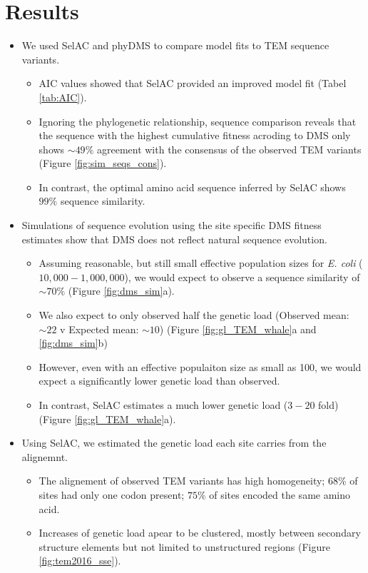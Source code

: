 \documentclass[12pt]{article}
\begin{document}
\section*{Results}
\begin{itemize}
	\item We used SelAC and phyDMS to compare model fits to TEM sequence variants.
	\begin{itemize}
		\item AIC values showed that SelAC provided an improved model fit (Tabel \ref{tab:AIC}).
		\item Ignoring the phylogenetic relationship, sequence comparison reveals that the sequence with the highest cumulative fitness acroding to DMS only shows $\sim49 \%$ agreement with the consensus of the observed TEM variants (Figure \ref{fig:sim_seqs_cons}).
		\item In contrast, the optimal amino acid sequence inferred by SelAC shows $99\%$ sequence similarity.
	\end{itemize}
	\item Simulations of sequence evolution using the site specific DMS fitness estimates show that DMS does not reflect natural sequence evolution.
	\begin{itemize}
		\item Assuming reasonable, but still small effective population sizes for \textit{E. coli} ($10,000 - 1,000,000$), we would expect to observe a sequence similarity of $\sim 70 \%$ (Figure \ref{fig:dms_sim}a).
		\item We also expect to only observed half the genetic load (Observed mean: $\sim 22$ v Expected mean: $\sim 10$) (Figure \ref{fig:gl_TEM_whale}a and \ref{fig:dms_sim}b)
		\item However, even with an effective populaiton size as small as 100, we would expect a significantly lower genetic load than observed.
		\item In contrast, SelAC estimates a much lower genetic load ($3 - 20$ fold) (Figure \ref{fig:gl_TEM_whale}a).
	\end{itemize}
	\item Using SelAC, we estimated the genetic load each site carries from the alignemnt.
	\begin{itemize}
		\item The alignement of observed TEM variants has high homogeneity;  $68 \%$ of sites had only one codon present; $75 \%$ of sites encoded the same amino acid.
		\item Increases of genetic load apear to be clustered, mostly between secondary structure elements but not limited to unstructured regions (Figure \ref{fig:tem2016_sse}).

\end{itemize}
\end{itemize}
\end{document}
